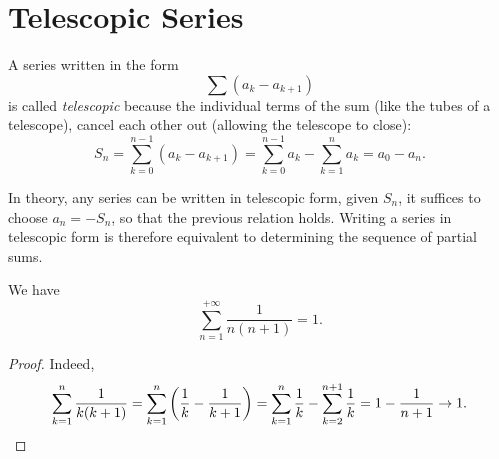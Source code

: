 \section{Telescopic Series}

A series written in the form
\[
  \sum (a_{k} - a_{k+1})
\]
is called \emph{telescopic}
%
because the individual terms of the sum (like the tubes of a telescope),
cancel each other out (allowing the telescope to close):
\[
  S_n 
  = \sum_{k=0}^{n-1} (a_{k} - a_{k+1})
  = \sum_{k=0}^{n-1} a_k - \sum_{k=1}^{n} a_k
  = a_0 - a_n.
\]

In theory, any series can be written in telescopic form,
given $S_n$, it suffices to choose $a_n=-S_n$, 
so that the previous relation holds. 
Writing a series in telescopic form is therefore equivalent to 
determining the sequence of partial sums.

\begin{example}
\mymark{**}
We have
\[
  \sum_{n=1}^{+\infty} \frac{1}{n(n+1)} = 1.
\]
\end{example}
%
\begin{proof}
\mymark{**}
Indeed,
\[
  \sum_{k=1}^n \frac{1}{k(k+1)}
  = \sum_{k=1}^n {\left( \frac{1}{k} - \frac{1}{k+1} \right)}
  = \sum_{k=1}^n \frac{1}{k} - \sum_{k=2}^{n+1} \frac{1}{k}
  = 1 - \frac{1}{n+1} \to 1.
\]
\end{proof}